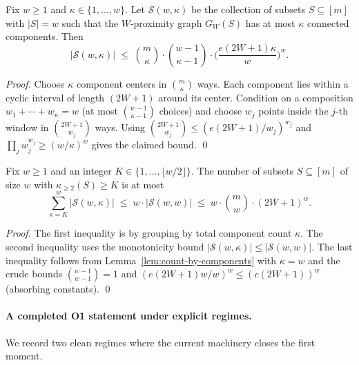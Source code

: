 \begin{lemma}
\label{lem:count-by-components}
Fix $w\ge 1$ and $\kappa\in\{1,\dots,w\}$.
Let $\mathcal S(w,\kappa)$ be the collection of subsets $S\subseteq [m]$ with $|S|=w$ such that the $W$-proximity graph
$G_W(S)$ has at most $\kappa$ connected components.
Then
\[
|\mathcal S(w,\kappa)|
\;\le\;
\binom{m}{\kappa}\cdot \binom{w-1}{\kappa-1}\cdot \Big(\frac{e(2W+1)\kappa}{w}\Big)^{w}.
\]
\end{lemma}

\begin{proof}
Choose $\kappa$ component centers in $\binom{m}{\kappa}$ ways.
Each component lies within a cyclic interval of length $(2W+1)$ around its center.
Condition on a composition $w_1+\cdots+w_\kappa=w$ (at most $\binom{w-1}{\kappa-1}$ choices) and choose $w_j$ points
inside the $j$-th window in $\binom{2W+1}{w_j}$ ways.
Using $\binom{2W+1}{w_j}\le (e(2W+1)/w_j)^{w_j}$ and $\prod_j w_j^{w_j}\ge (w/\kappa)^w$ gives the claimed bound.
\qed
\end{proof}

\begin{lemma}
\label{lem:count-kappa-ge2}
Fix $w\ge 1$ and an integer $K\in\{1,\dots,\lfloor w/2\rfloor\}$.
The number of subsets $S\subseteq [m]$ of size $w$ with $\kappa_{\ge 2}(S)\ge K$ is at most
\[
\sum_{\kappa=K}^{w} |\mathcal S(w,\kappa)|
\;\le\;
w\cdot |\mathcal S(w,w)|
\;\le\;
w\cdot \binom{m}{w}\cdot (2W+1)^{w}.
\]
\end{lemma}

\begin{proof}
The first inequality is by grouping by total component count $\kappa$.
The second inequality uses the monotonicity bound $|\mathcal S(w,\kappa)|\le |\mathcal S(w,w)|$.
The last inequality follows from Lemma~\ref{lem:count-by-components} with $\kappa=w$ and the crude bounds
$\binom{w-1}{w-1}=1$ and $(e(2W+1)w/w)^w\le (c(2W+1))^w$ (absorbing constants).
\qed
\end{proof}

\paragraph{A completed O1 statement under explicit regimes.}
We record two clean regimes where the current machinery closes the first moment.

